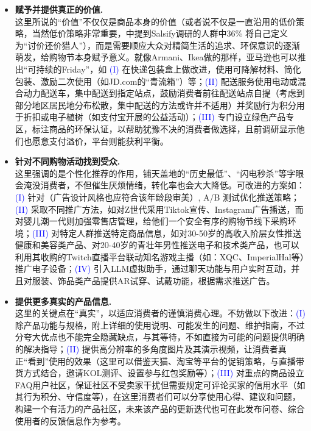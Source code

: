\documentclass[12pt]{ctexart}
\begin{document}
\begin{itemize}
    \item \textbf{赋予并提供真正的价值.} \\
    这里所说的“价值”不仅仅是商品本身的价值（或者说不仅是一直沿用的低价策略，当然低价策略非常重要，\cite{32}中提到Salsify调研的人群中36\% 将自己定义为“讨价还价猎人”），而是需要顺应大众对精简生活的追求、环保意识的逐渐萌发，给购物节本身赋予意义。就像Armani、Ikea做的那样，亚马逊也可以推出“可持续的Friday”，如 \textcolor{blue}{(I)} 在快递包装盒上做改进，使用可降解材料、简化包装、激励二次使用（如JD.com的“青流箱”）等；\textcolor{blue}{(II)} 配送服务使用电动或混合动力配送车，集中配送到指定站点，鼓励消费者前往配送站点自提（考虑到部分地区居民地分布松散，集中配送的方法或许并不适用）并奖励行为积分用于折扣或电子植树（如支付宝开展的公益活动）；\textcolor{blue}{(III)} 专门设立绿色产品专区，标注商品的环保认证，以帮助犹豫不决的消费者做选择，且前调研显示他们也愿意支付溢价，平台则能获利平衡。
    \item \textbf{针对不同购物活动找到受众.} \\
    这里强调的是个性化推荐的作用，铺天盖地的“历史最低”、“闪电秒杀”等字眼会淹没消费者，不但催生厌烦情绪，转化率也会大大降低。可改进的方案如：\textcolor{blue}{(I)} 针对（广告设计风格也应符合该年龄段审美）, A/B 测试优化推送策略；\textcolor{blue}{(II)} 采取不同推广方法，如对Z世代采用Tiktok宣传、Instagram广告播送，而对婴儿潮一代则加强零售店管理，给他们一个安全有序的购物节线下采购环境；\textcolor{blue}{(III)} 对特定人群推送特定商品信息，如对30-50岁的高收入阶层女性推送健康和美容类产品、对20-40岁的青壮年男性推送电子和技术类产品，也可以利用其收购的Twitch直播平台联动知名游戏主播（如：XQC、ImperialHal等）推广电子设备；\textcolor{blue}{(IV)} 引入LLM虚拟助手，通过聊天功能与用户实时互动，并且对服装、饰品类产品提供AR试穿、试戴功能，根据需求推送广告。
    \item \textbf{提供更多真实的产品信息.} \\
    这里的关键点在“真实”，以适应消费者的谨慎消费心理。不妨做以下改进：\textcolor{blue}{(I)} 除产品功能与规格，附上详细的使用说明、可能发生的问题、维护指南，不过分夸大优点也不能完全隐藏缺点，与其等待，不如直接为可能的问题提供明确的解决指导；\textcolor{blue}{(II)} 提供高分辨率的多角度图片及其演示视频，让消费者真正“看到”使用的效果（这里可以借鉴天猫、淘宝等平台的促销策略，与直播带货方式结合，邀请KOL测评、设置参与红包奖励等）；\textcolor{blue}{(III)} 对重点的商品设立FAQ用户社区，保证社区不受卖家干扰但需要规定可评论买家的信用水平（如其行为积分、守信度等），在这里消费者们可以分享使用心得、建议和问题，构建一个有活力的产品社区，未来该产品的更新迭代也可在此发布问卷、综合使用者的反馈信息作为参考。

\end{itemize}
\end{document}
